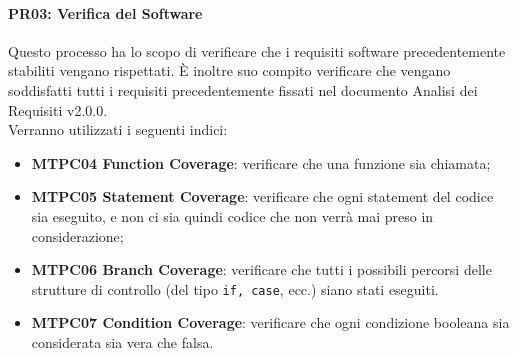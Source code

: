 \iffalse
\paragraph{MTPC04 Cost Variance(CV)}\-\\
Indice che quantifica la produttività o efficienza monitorando se il valore del costo realmente maturato è minore, maggiore o uguale al costo effettivo.
Calcolo:
\begin{center}
	\item \textbf{CV = BCWP - ACWP}
\end{center}
dove:
\begin{itemize}
	\item BCWP: valore delle attività realizzate alla data odierna(in euro o giorni);
	\item ACWP: costo effettivo sostenuto per completare le attività alla data odierna(in euro o giorni).
\end{itemize}
Se CV > 0 significa che il progetto produce con maggior efficienza e minor costo.
\fi

\paragraph{PR03: Verifica del Software}
Questo processo ha lo scopo di verificare che i requisiti software precedentemente stabiliti vengano rispettati. È inoltre suo compito verificare che vengano soddisfatti
tutti i requisiti precedentemente fissati nel documento Analisi dei Requisiti v2.0.0. \-\\ Verranno utilizzati i seguenti indici:

\begin{itemize}
	\item \textbf{MTPC04 Function Coverage}: verificare che una funzione sia chiamata;
	\item \textbf{MTPC05 Statement Coverage}: verificare che ogni statement del codice sia eseguito, e non ci sia quindi codice che non verrà mai preso in considerazione;
	\item \textbf{MTPC06 Branch Coverage}: verificare che tutti i possibili percorsi delle strutture di controllo (del tipo \texttt{if, case}, ecc.) siano stati eseguiti.
	\item \textbf{MTPC07 Condition Coverage}: verificare che ogni condizione booleana sia considerata sia vera che falsa.
\end{itemize}

